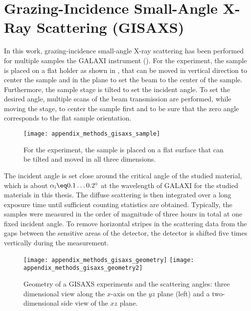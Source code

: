 \documentclass[\main/dresen_thesis.tex]{subfiles}
\begin{document}
  \section{Grazing-Incidence Small-Angle X-Ray Scattering (GISAXS)}
    \label{app:methods:gisaxs}
    In this work, grazing-incidence small-angle X-ray scattering has been performed for multiple samples the GALAXI instrument ().
    For the experiment, the sample is placed on a flat holder as shown in , that can be moved in vertical direction to center the sample and in the plane to set the beam to the center of the sample.
    Furthermore, the sample stage is tilted to set the incident angle.
    To set the desired angle, multiple scans of the beam transmission are performed, while moving the stage, to center the sample first and to be sure that the zero angle corresponds to the flat sample orientation.
    \begin{figure}[tb]
      \centering
      \texttt{[image: appendix\_methods\_gisaxs\_sample]}
      \caption{\label{fig:appendix:methods:saxs:samples}For the experiment, the sample is placed on a flat surface that can be tilted and moved in all three dimensions.}
    \end{figure}

    The incident angle is set close around the critical angle of the studied material, which is about $\alpha_\mathrm{i} \eq 0.1 \ldots 0.2 ^\circ$ at the wavelength of GALAXI for the studied materials in this thesis.
    The diffuse scattering is then integrated over a long exposure time until sufficient counting statistics are obtained.
    Typically, the samples were measured in the order of magnitude of three hours in total at one fixed incident angle.
    To remove horizontal stripes in the scattering data from the gaps between the sensitive areas of the detector, the detector is shifted five times vertically during the measurement.

    \begin{figure}[tb]
      \centering
      \texttt{[image: appendix\_methods\_gisaxs\_geometry]}
      \texttt{[image: appendix\_methods\_gisaxs\_geometry2]}
      \caption{\label{fig:appendix:methods:gisaxs:geometry}Geometry of a GISAXS experiments and the scattering angles: three dimensional view along the $x$-axis on the $yz$ plane (left) and a two-dimensional side view of the $xz$ plane.}
    \end{figure}
\end{document}
